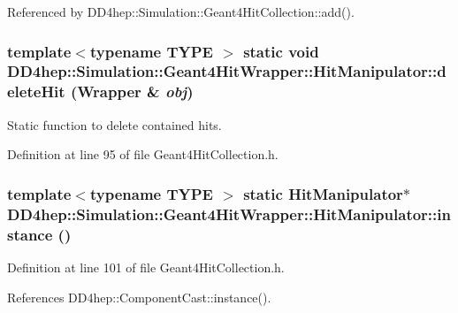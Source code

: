 Referenced by DD4hep::Simulation::Geant4HitCollection::add().\hypertarget{class_d_d4hep_1_1_simulation_1_1_geant4_hit_wrapper_1_1_hit_manipulator_a6c55d83023a6fcc13971bb3ca50f1384}{
\subsubsection[{deleteHit}]{\setlength{\rightskip}{0pt plus 5cm}template$<$typename TYPE $>$ static void DD4hep::Simulation::Geant4HitWrapper::HitManipulator::deleteHit ({\bf Wrapper} \& {\em obj})}}
\label{class_d_d4hep_1_1_simulation_1_1_geant4_hit_wrapper_1_1_hit_manipulator_a6c55d83023a6fcc13971bb3ca50f1384}


Static function to delete contained hits. 

Definition at line 95 of file Geant4HitCollection.h.\hypertarget{class_d_d4hep_1_1_simulation_1_1_geant4_hit_wrapper_1_1_hit_manipulator_acba054bd41db4731407713d4a1cdfd47}{
\subsubsection[{instance}]{\setlength{\rightskip}{0pt plus 5cm}template$<$typename TYPE $>$ static {\bf HitManipulator}$\ast$ DD4hep::Simulation::Geant4HitWrapper::HitManipulator::instance ()}}
\label{class_d_d4hep_1_1_simulation_1_1_geant4_hit_wrapper_1_1_hit_manipulator_acba054bd41db4731407713d4a1cdfd47}


Definition at line 101 of file Geant4HitCollection.h.

References DD4hep::ComponentCast::instance().

